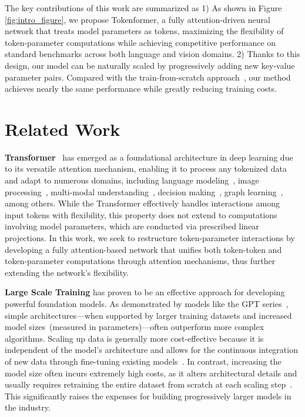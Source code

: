\documentclass{article} %
\newcommand{\ourmethod}{Tokenformer\xspace}
\begin{document}
The key contributions of this work are summarized as 1) As shown in Figure \ref{fig:intro_figure}, we propose \ourmethod, a fully attention-driven neural network that treats model parameters as tokens, maximizing the flexibility of token-parameter computations while achieving competitive performance on standard benchmarks across both language and vision domains. 2) Thanks to this design, our model can be naturally scaled by progressively adding new key-value parameter pairs. Compared with the train-from-scratch approach~\citep{biderman2023pythia,kaplan2020scaling}, our method achieves nearly the same performance while greatly reducing training costs. 

\section{Related Work}
\textbf{Transformer}~\citep{vaswani2017attention} has emerged as a foundational architecture in deep learning due to its versatile attention mechanism, enabling it to process any tokenized data and adapt to numerous domains, including language modeling~\citep{radford2018improving, touvron2023llama}, image processing~\citep{dosovitskiy2021an}, multi-modal understanding~\citep{liu2023visual, wang2024git, wang2023unitr, wang2022ofa}, decision making~\citep{chen2021decision}, graph learning~\citep{yun2019graph}, among others. While the Transformer effectively handles interactions among input tokens with flexibility, this property does not extend to computations involving model parameters, which are conducted via prescribed linear projections. In this work, we seek to restructure token-parameter interactions by developing a fully attention-based network that unifies both token-token and token-parameter computations through attention mechanisms, thus further extending the network's flexibility.

\textbf{Large Scale Training} has proven to be an effective approach for developing powerful foundation models. As demonstrated by models like the GPT series~\citep{radford2018improving, radford2019language,brown2020language}, simple architectures—when supported by larger training datasets and increased model sizes~(measured in parameters)—often outperform more complex algorithms. Scaling up data is generally more cost-effective because it is independent of the model's architecture and allows for the continuous integration of new data through fine-tuning existing models~\citep{kaplan2020scaling}. In contrast, increasing the model size often incurs extremely high costs, as it alters architectural details and usually requires retraining the entire dataset from scratch at each scaling step~\citep{biderman2023pythia}. This significantly raises the expenses for building progressively larger models in the industry.
\end{document}
